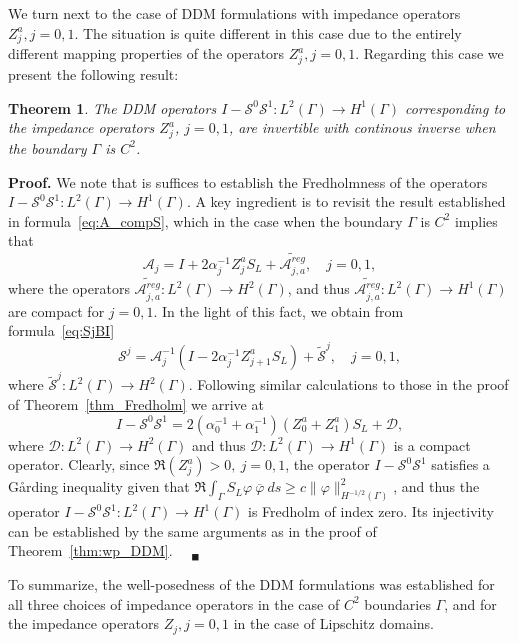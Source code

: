 \documentclass[11pt]{article}
\numberwithin{equation}{section}
\newtheorem{theorem}{Theorem}[section]
\newenvironment{proof}{\hspace{0.5cm} {\bf Proof.}}
{$\quad {}_\blacksquare$\vspace{0.3cm}}
\begin{document}
We turn next to the case of DDM formulations with impedance operators $Z_j^{a},j=0,1$. The situation is quite different in this case due to the entirely different mapping properties of the operators $Z_j^{a},j=0,1$. Regarding this case we present the following result:
\begin{theorem}\label{thm:wp_DDM_a}
  The DDM operators $I-\mathcal{S}^0\mathcal{S}^1:L^2(\Gamma)\to H^1(\Gamma)$ corresponding to the impedance operators $Z_j^{a}$, $j=0,1$, are invertible with continous inverse when the boundary $\Gamma$ is $C^2$.
\end{theorem}
\begin{proof}
  We note that is suffices to establish the Fredholmness of the operators $I-\mathcal{S}^0\mathcal{S}^1:L^2(\Gamma)\to H^1(\Gamma)$. A key ingredient is to revisit the result established in formula~\eqref{eq:A_compS}, which in the case when the boundary $\Gamma$ is $C^2$ implies that
  \[
  \mathcal{A}_j=I+2\alpha_j^{-1}Z_j^aS_L+\widetilde{\mathcal{A}_{j,a}^{reg}},\quad j=0,1,
  \]
  where the operators $\widetilde{\mathcal{A}_{j,a}^{reg}}:L^2(\Gamma)\to H^{2}(\Gamma)$, and thus $\widetilde{\mathcal{A}_{j,a}^{reg}}:L^2(\Gamma)\to H^1(\Gamma)$ are compact for $j=0,1$. In the light of this fact, we obtain from formula~\eqref{eq:SjBI}
  \[
  \mathcal{S}^j=\mathcal{A}_j^{-1}(I-2\alpha_j^{-1}Z_{j+1}^aS_L)+\widetilde{\mathcal{S}}^j,\quad j=0,1,
  \]
  where $\widetilde{\mathcal{S}}^j:L^2(\Gamma)\to H^2(\Gamma)$. Following similar calculations to those in the proof of Theorem~\ref{thm_Fredholm} we arrive at
  \[
  I-\mathcal{S}^0\mathcal{S}^1=2(\alpha_0^{-1}+\alpha_1^{-1})(Z_0^a+Z_1^a)S_L+\mathcal{D},
  \]
  where $\mathcal{D}:L^2(\Gamma)\to H^2(\Gamma)$ and thus $\mathcal{D}:L^2(\Gamma)\to H^1(\Gamma)$ is a compact operator. Clearly, since $\Re(Z_j^a)>0,\ j=0,1$, the operator $I-\mathcal{S}^0\mathcal{S}^1$ satisfies a G\aa rding inequality given that $\Re \int_\Gamma S_L\varphi\ \overline{\varphi}\ ds\geq c\|\varphi\|^2_{H^{-1/2}(\Gamma)}$, and thus the operator $I-\mathcal{S}^0\mathcal{S}^1:L^2(\Gamma)\to H^1(\Gamma)$ is Fredholm of index zero. Its injectivity can be established by the same arguments as in the proof of Theorem~\ref{thm:wp_DDM}.
\end{proof}

To summarize, the well-posedness of the DDM formulations was established for all three choices of impedance operators in the case of $C^2$ boundaries $\Gamma$, and for the impedance operators $Z_j,j=0,1$ in the case of Lipschitz domains. 
\end{document}
